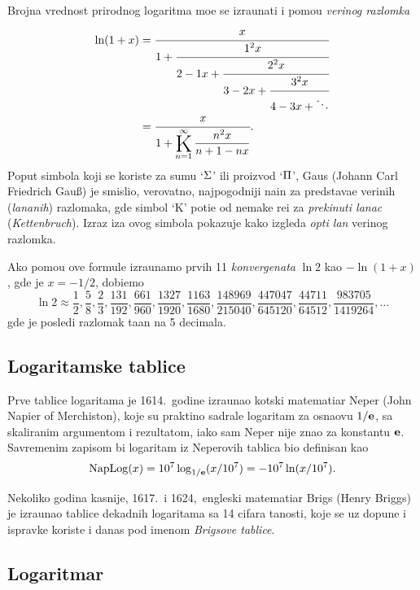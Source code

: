 \documentclass[12pt, twoside, a4paper]{article}
\def\idx#1{#1\index{#1}}
\def\K{\mathop{\vcenter{\hbox{\rm\huge K}}}\limits}
\def\n{n}
\def\Ki{\K_{\n=1}}
\def\Kinf#1#2{\Ki^\infty\displaystyle{\frac{#1}{#2}}}
\def\e{{\bf e}}
\def\naplog{\mathop{\rm NapLog}\nolimits}
\begin{document}
Brojna vrednost prirodnog logaritma mo{\zv}e se izra{\cv}unati i pomo{\cc}u {\sl veri{\zv}nog razlomka}
\begin{equation}\label{eq:verige}
\begin{aligned}
\ln(1+x)
&=\cfrac{x}{1+\cfrac{1^2x}{2-1x+\cfrac{2^2x}{3-2x+\cfrac{3^2x}{4-3x+\ddots}}}}\\
\noalign{\vskip-3pt}
&=\cfrac{x}{1+ \Kinf{\n^2x}{\n+1-\n x}}.
\end{aligned}
\end{equation}
Poput simbola koji se koriste za sumu `$\rm\Sigma$' ili proizvod `$\rm\Pi$', 
\idx{Gaus} (Johann Carl Friedrich Gau\ss) je smislio, verovatno, najpogodniji na{\cv}in za predstav{\lj}a{\nj}e
veri{\zv}nih ({\sl lan\-{\cv}a\-nih\/}) razlomaka,
gde simbol `K' poti{\cv}e od nema{\cv}ke re{\cv}i za {\sl prekinuti lanac\/} ({\sl Kettenbruch\/}). 
Izraz iza ovog simbola pokazuje kako izgleda {\sl op{\sv}ti {\cv}lan\/} veri{\zv}nog razlomka.

\def\ff#1/#2,{\frac{#1}{#2},}
Ako pomo{\cc}u ove formule izra{\cv}unamo prvih 11 {\sl konvergenata\/} $\ln2$ kao $-\ln(1+x)$, 
gde je $x=-1/2$,
dobi{\cc}emo
$$
\ln2\approx\ff1/2, \ff5/8, \ff2/3, \ff131/192, \ff661/960, \ff1327/1920, \ff1163/1680, \ff148969/215040, 
\ff447047/645120, \ff44711/64512, \ff983705/1419264, \dots
$$
gde je posled{\nj}i razlomak ta{\cv}an na 5 decimala.


\subsection{Logaritamske tablice}

Prve tablice logaritama je 1614.\ godine izra{\cv}unao {\sv}kotski matemati{\cv}ar \idx{Neper} (John Napier of Merchiston),
koje su prakti{\cv}no sadr{\zv}ale logaritam za osnaovu $1/\e$, sa ska\-li\-ra\-nim argumentom i rezultatom,
iako sam Neper nije znao za konstantu $\e$.
Savremenim zapisom bi logaritam iz Neperovih tablica bio definisan kao
$$
\naplog (x) = 10^7\log_{1/\e}(x/10^7) = -10^7\ln(x/10^7).
$$

Nekoliko godina kasnije, 1617.\ i 1624,\ engleski matemati{\cv}ar \idx{Brigs} (Henry Briggs) je izra{\cv}unao
tablice de\-kad\-nih logaritama sa 14 cifara ta{\cv}nosti, koje se uz dopune i ispravke
koriste i danas pod imenom {\sl Brigsove tablice}.


\subsection{Logaritmar}
\end{document}
